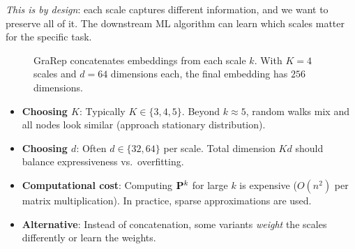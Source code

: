 \begin{notechapter}
\begin{keyidea}
\emph{This is by design}: each scale captures different information, and we want to preserve all of it. The downstream ML algorithm can learn which scales matter for the specific task.
\end{keyidea}

\begin{figure}[htbp]
\centering
{}
\caption{GraRep concatenates embeddings from each scale $k$. With $K=4$ scales and $d=64$ dimensions each, the final embedding has $256$ dimensions.}
\label{shallow-embeddings:fig:grarep_concat}
\end{figure}

\begin{remark}
\leavevmode
\begin{itemize}
    \item \textbf{Choosing $K$}: Typically $K \in \{3, 4, 5\}$. Beyond $k \approx 5$, random walks mix and all nodes look similar (approach stationary distribution).
    \item \textbf{Choosing $d$}: Often $d \in \{32, 64\}$ per scale. Total dimension $Kd$ should balance expressiveness vs.\ overfitting.
    \item \textbf{Computational cost}: Computing $\mathbf{P}^k$ for large $k$ is expensive ($O(n^2)$ per matrix multiplication). In practice, sparse approximations are used.
    \item \textbf{Alternative}: Instead of concatenation, some variants \emph{weight} the scales differently or learn the weights.
\end{itemize}
\end{remark}


\end{notechapter}
